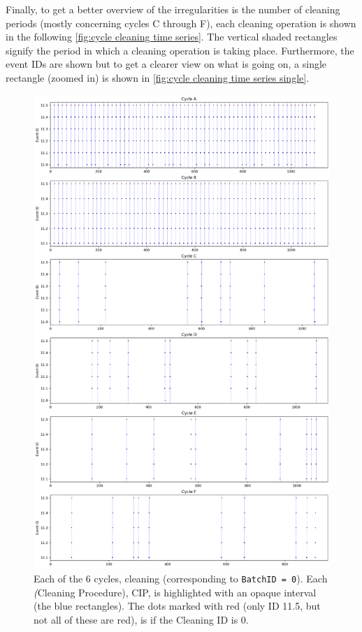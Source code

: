 \documentclass[../Thesis.tex]{subfiles}
\begin{document}
Finally, to get a better overview of the irregularities is the number of cleaning periods (mostly concerning cycles C through F), each cleaning operation is shown in the following \autoref{fig:cycle cleaning time series}. The vertical shaded rectangles signify the period in which a cleaning operation is taking place. Furthermore, the event IDs are shown but to get a clearer view on what is going on, a single rectangle (zoomed in) is shown in \autoref{fig:cycle cleaning time series single}.

\begin{figure}[H]
    \centering
    \includegraphics[width=0.9\linewidth]{figures/Multiple cycles data/Cleaning batches.png}
    \caption{Each of the 6 cycles, cleaning (corresponding to \texttt{BatchID = 0}). Each \textit(Cleaning Procedure), CIP, is highlighted with an opaque interval (the blue rectangles). The dots marked with red (only ID 11.5, but not all of these are red), is if the Cleaning ID is 0.}
    \label{fig:cycle cleaning time series}
\end{figure}
\end{document}
